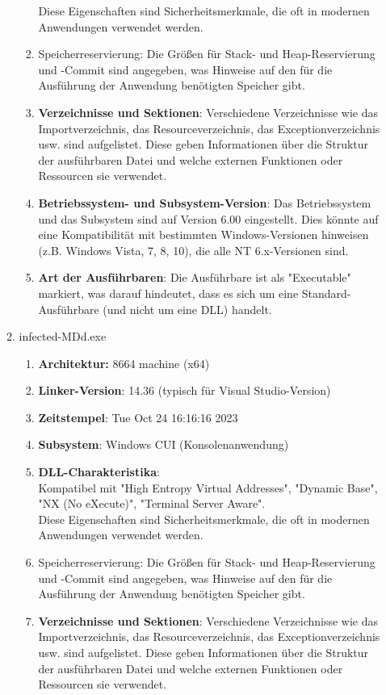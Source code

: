\documentclass{article}
\begin{document}
\begin{enumerate}
\begin{enumerate}
\begin{enumerate}
				Diese Eigenschaften sind Sicherheitsmerkmale, die oft in modernen Anwendungen verwendet werden.
				\item Speicherreservierung: Die Größen für Stack- und Heap-Reservierung und -Commit sind angegeben, was Hinweise auf den für die Ausführung der Anwendung benötigten Speicher gibt.
				\item \textbf{Verzeichnisse und Sektionen}: Verschiedene Verzeichnisse wie das Importverzeichnis, das Resourceverzeichnis, das Exceptionverzeichnis usw. sind aufgelistet. Diese geben Informationen über die Struktur der ausführbaren Datei und welche externen Funktionen oder Ressourcen sie verwendet.
				\item \textbf{Betriebssystem- und Subsystem-Version}: Das Betriebssystem und das Subsystem sind auf Version 6.00 eingestellt. Dies könnte auf eine Kompatibilität mit bestimmten Windows-Versionen hinweisen (z.B. Windows Vista, 7, 8, 10), die alle NT 6.x-Versionen sind.
				\item \textbf{Art der Ausführbaren}: Die Ausführbare ist als "Executable" markiert, was darauf hindeutet, dass es sich um eine Standard-Ausführbare (und nicht um eine DLL) handelt.
			\end{enumerate}
			\item infected-MDd.exe
			\begin{enumerate}
				\item \textbf{Architektur:} 8664 machine (x64)
				\item \textbf{Linker-Version}: 14.36 (typisch für Visual Studio-Version)
				\item \textbf{Zeitstempel}: Tue Oct 24 16:16:16 2023
				\item \textbf{Subsystem}: Windows CUI (Konsolenanwendung)
				\item \textbf{DLL-Charakteristika}:\\
				Kompatibel mit "High Entropy Virtual Addresses", "Dynamic Base", "NX (No eXecute)", "Terminal Server Aware".\\
				Diese Eigenschaften sind Sicherheitsmerkmale, die oft in modernen Anwendungen verwendet werden.
				\item Speicherreservierung: Die Größen für Stack- und Heap-Reservierung und -Commit sind angegeben, was Hinweise auf den für die Ausführung der Anwendung benötigten Speicher gibt.
				\item \textbf{Verzeichnisse und Sektionen}: Verschiedene Verzeichnisse wie das Importverzeichnis, das Resourceverzeichnis, das Exceptionverzeichnis usw. sind aufgelistet. Diese geben Informationen über die Struktur der ausführbaren Datei und welche externen Funktionen oder Ressourcen sie verwendet.

\end{enumerate}
\end{enumerate}
\end{enumerate}
\end{document}
